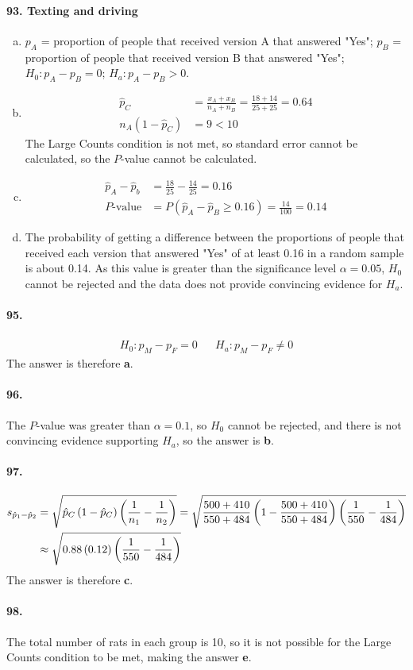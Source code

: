 			\paragraph{93. Texting and driving}
				\begin{enumerate}[a.]
					\item
						$p_A$ = proportion of people that received version A that answered "Yes"; $p_B$ = proportion of people that received version B that answered "Yes"; $H_0: p_A - p_B = 0$; $H_a: p_A - p_B > 0$.
					\item
						\begin{align*}
							\hat{p}_C &= \frac{x_A + x_B}{n_A + n_B} = \frac{18 + 14}{25 + 25} = 0.64 \\
							n_A(1 - \hat{p}_C) &= 9 < 10
						\end{align*}
						The Large Counts condition is not met, so standard error cannot be calculated, so the $P$-value cannot be calculated.
					\item
						\begin{align*}
							\hat{p}_A - \hat{p}_b &= \frac{18}{25} - \frac{14}{25} = 0.16 \\
							P\text{-value} &= P(\hat{p}_A - \hat{p}_B \ge 0.16) = \frac{14}{100} = 0.14
						\end{align*}
					\item
						The probability of getting a difference between the proportions of people that received each version that answered "Yes" of at least 0.16 in a random sample is about 0.14. As this value is greater than the significance level $\alpha = 0.05$, $H_0$ cannot be rejected and the data does not provide convincing evidence for $H_a$.
				\end{enumerate}
			\paragraph{95.}
				\begin{align*}
					H_0:p_M - p_F = 0 && H_a: p_M - p_F \ne 0
				\end{align*}
				The answer is therefore \textbf{a}.
			\paragraph{96.}
				The $P$-value was greater than $\alpha = 0.1$, so $H_0$ cannot be rejected, and there is not convincing evidence supporting $H_a$, so the answer is \textbf{b}.
			\paragraph{97.}
				\begin{align*}
					s_{\hat{p}_1 - \hat{p}_2} &= \sqrt{\hat{p}_C\left(1 - \hat{p}_C\right)\left(\frac{1}{n_1} - \frac{1}{n_2}\right)} = \sqrt{\frac{500 + 410}{550 + 484}\left(1 - \frac{500 + 410}{550 + 484}\right)\left(\frac{1}{550} - \frac{1}{484}\right)} \\
					&\approx \sqrt{0.88\left(0.12\right)\left(\frac{1}{550} - \frac{1}{484}\right)}
				\end{align*}
				The answer is therefore \textbf{c}.
			\paragraph{98.}
				The total number of rats in each group is 10, so it is not possible for the Large Counts condition to be met, making the answer \textbf{e}.
